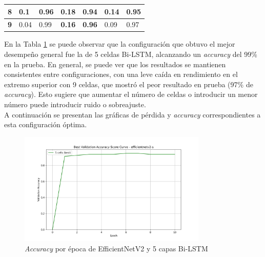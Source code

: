 \begin{table}[h!]
\begin{tabular}{|l|l|l|l|l|l|l|}
\textbf{8}                                                         & 0.1                                                                       & 0.96                                                                       & 0.18                                                                   & 0.94                                                                    & 0.14                                                               & 0.95                                                                \\ \hline
\textbf{9}                                                         & 0.04                                                                      & 0.99                                                                       & \textbf{0.16}                                                          & \textbf{0.96}                                                           & 0.09                                                               & 0.97                                                                \\ \hline
\end{tabular}
\label{table:efficientnetV2Metrics}
\end{table}

En la Tabla \ref{table:efficientnetV2Metrics} se puede observar 
que la configuración que obtuvo el mejor desempeño general fue 
la de 5 celdas Bi-LSTM, alcanzando un \textit{accuracy} del 99\% 
en la prueba. En general, se puede ver que los resultados se mantienen 
consistentes entre configuraciones, con una leve caída en 
rendimiento en el extremo superior con 9 celdas, que mostró el peor 
resultado en prueba (97\% de \textit{accuracy}). Esto sugiere que 
aumentar el número de celdas o introducir un menor número puede 
introducir ruido o sobreajuste.\\

A continuación se presentan las gráficas de pérdida y 
\textit{accuracy} correspondientes a esta configuración óptima.

\begin{figure}[h!] 
    \includegraphics[width=0.8\textwidth]{../graphs/efficientnetv2-s_best_val_accuracy.png} 
    \centering 
    \caption{\textit{Accuracy} por época de EfficientNetV2 y 5 capas Bi-LSTM } 
    \label{EfficientNetV2Accuracy} 
\end{figure}

